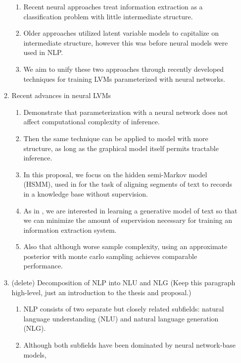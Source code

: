 \documentclass[11pt]{article}
\begin{document}
\begin{enumerate}
\begin{enumerate}
\begin{enumerate}
        \item Recent neural approaches treat information extraction as a classification problem
            with little intermediate structure.
        \item Older approaches utilized latent variable models to capitalize on intermediate structure,
            however this was before neural models were used in NLP.
            \citep{surdeanu2012miml,liang2009semalign}
        \item We aim to unify these two approaches through recently developed techniques for training LVMs
            parameterized with neural networks.
        \end{enumerate}
    \item Recent advances in neural LVMs
        \begin{enumerate}
        \item Demonstrate that parameterization with a neural network does not affect computational
            complexity of inference.
        \item Then the same technique can be applied to model with more structure,
            as long as the graphical model itself permits tractable inference.
        \item In this proposal, we focus on the hidden semi-Markov model (HSMM),
            used in \citet{liang2009semalign} for the task of aligning segments of text to
            records in a knowledge base without supervision. 
        \item As in \citet{liang2009semalign}, we are interested in learning a generative model of text so that
            we can minimize the amount of supervision necessary for training an
            information extraction system.
        \item Also that although worse sample complexity, using an approximate posterior
            with monte carlo sampling achieves comparable performance.
        \end{enumerate}
    \item (delete) Decomposition of NLP into NLU and NLG
        (Keep this paragraph high-level, just an introduction to the thesis and proposal.)
        \begin{enumerate}
        \item NLP consists of two separate but closely related subfields:
            natural language understanding (NLU) and natural language generation (NLG).
        \item Although both subfields have been dominated by neural network-base models,

\end{enumerate}
\end{enumerate}
\end{enumerate}
\end{document}
